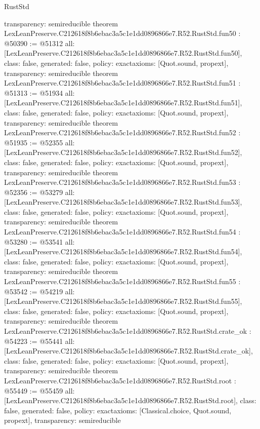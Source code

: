 \begin{lexlean}{RustStd}
\begin{coremodule}
{  transparency: semireducible
}
theorem LexLeanPreserve.C212618f8b6ebac3a5c1e1dd0896866e7.R52.RustStd.fun50 : @50390 := @51312 {
  all: [LexLeanPreserve.C212618f8b6ebac3a5c1e1dd0896866e7.R52.RustStd.fun50],
  class: false,
  generated: false,
  policy: exact{axioms: [Quot.sound, propext]},
  transparency: semireducible
}
theorem LexLeanPreserve.C212618f8b6ebac3a5c1e1dd0896866e7.R52.RustStd.fun51 : @51313 := @51934 {
  all: [LexLeanPreserve.C212618f8b6ebac3a5c1e1dd0896866e7.R52.RustStd.fun51],
  class: false,
  generated: false,
  policy: exact{axioms: [Quot.sound, propext]},
  transparency: semireducible
}
theorem LexLeanPreserve.C212618f8b6ebac3a5c1e1dd0896866e7.R52.RustStd.fun52 : @51935 := @52355 {
  all: [LexLeanPreserve.C212618f8b6ebac3a5c1e1dd0896866e7.R52.RustStd.fun52],
  class: false,
  generated: false,
  policy: exact{axioms: [Quot.sound, propext]},
  transparency: semireducible
}
theorem LexLeanPreserve.C212618f8b6ebac3a5c1e1dd0896866e7.R52.RustStd.fun53 : @52356 := @53279 {
  all: [LexLeanPreserve.C212618f8b6ebac3a5c1e1dd0896866e7.R52.RustStd.fun53],
  class: false,
  generated: false,
  policy: exact{axioms: [Quot.sound, propext]},
  transparency: semireducible
}
theorem LexLeanPreserve.C212618f8b6ebac3a5c1e1dd0896866e7.R52.RustStd.fun54 : @53280 := @53541 {
  all: [LexLeanPreserve.C212618f8b6ebac3a5c1e1dd0896866e7.R52.RustStd.fun54],
  class: false,
  generated: false,
  policy: exact{axioms: [Quot.sound, propext]},
  transparency: semireducible
}
theorem LexLeanPreserve.C212618f8b6ebac3a5c1e1dd0896866e7.R52.RustStd.fun55 : @53542 := @54219 {
  all: [LexLeanPreserve.C212618f8b6ebac3a5c1e1dd0896866e7.R52.RustStd.fun55],
  class: false,
  generated: false,
  policy: exact{axioms: [Quot.sound, propext]},
  transparency: semireducible
}
theorem LexLeanPreserve.C212618f8b6ebac3a5c1e1dd0896866e7.R52.RustStd.crate_ok : @54223 := @55441 {
  all: [LexLeanPreserve.C212618f8b6ebac3a5c1e1dd0896866e7.R52.RustStd.crate_ok],
  class: false,
  generated: false,
  policy: exact{axioms: [Quot.sound, propext]},
  transparency: semireducible
}
theorem LexLeanPreserve.C212618f8b6ebac3a5c1e1dd0896866e7.R52.RustStd.root : @55449 := @55459 {
  all: [LexLeanPreserve.C212618f8b6ebac3a5c1e1dd0896866e7.R52.RustStd.root],
  class: false,
  generated: false,
  policy: exact{axioms: [Classical.choice, Quot.sound, propext]},
  transparency: semireducible
}


\end{coremodule}
\end{lexlean}
